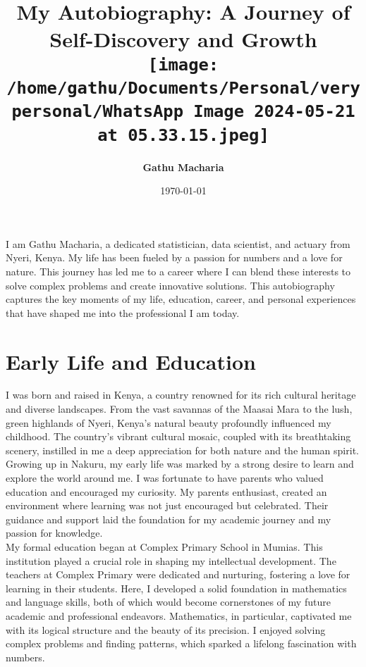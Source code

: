 \documentclass[12pt,a4paper,sans,english]{report}
\title{\textbf{My Autobiography: A Journey of Self-Discovery and Growth}\\
	\texttt{[image: /home/gathu/Documents/Personal/verypersonal/WhatsApp Image 2024-05-21 at 05.33.15.jpeg]}
}
\author{\huge \textbf{Gathu Macharia}}
\date{\today}
\begin{document}
	\maketitle
	
I am Gathu Macharia, a dedicated statistician, data scientist, and actuary from Nyeri, Kenya. My life has been fueled by a passion for numbers and a love for nature. This journey has led me to a career where I can blend these interests to solve complex problems and create innovative solutions. This autobiography captures the key moments of my life, education, career, and personal experiences that have shaped me into the professional I am today.


	\tableofcontents
	
	
	\chapter{Early Life and Education}
	

	
	I was born and raised in Kenya, a country renowned for its rich cultural heritage and diverse landscapes. From the vast savannas of the Maasai Mara to the lush, green highlands of Nyeri, Kenya's natural beauty profoundly influenced my childhood. The country’s vibrant cultural mosaic, coupled with its breathtaking scenery, instilled in me a deep appreciation for both nature and the human spirit.\\
	
\noindent	Growing up in Nakuru, my early life was marked by a strong desire to learn and explore the world around me. I was fortunate to have parents who valued education and encouraged my curiosity. My parents enthusiast, created an environment where learning was not just encouraged but celebrated. Their guidance and support laid the foundation for my academic journey and my passion for knowledge.\\
	
\noindent	My formal education began at Complex Primary School in Mumias. This institution played a crucial role in shaping my intellectual development. The teachers at Complex Primary were dedicated and nurturing, fostering a love for learning in their students. Here, I developed a solid foundation in mathematics and language skills, both of which would become cornerstones of my future academic and professional endeavors. Mathematics, in particular, captivated me with its logical structure and the beauty of its precision. I enjoyed solving complex problems and finding patterns, which sparked a lifelong fascination with numbers.\\
	
\end{document}
